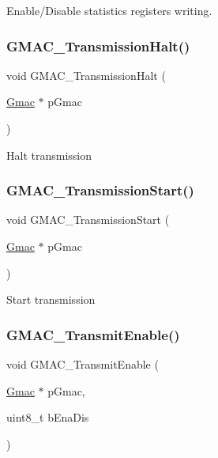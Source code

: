 Enable/\+Disable statistics registers writing. \mbox{\label{group__gmac__defines_gaec157405c56f5074b5f49268d3148c55}} 
\subsubsection{\texorpdfstring{GMAC\_TransmissionHalt()}{GMAC\_TransmissionHalt()}}
{\footnotesize\ttfamily void G\+M\+A\+C\+\_\+\+Transmission\+Halt (\begin{DoxyParamCaption}\item[{\mbox{\hyperlink{structGmac}{Gmac}} $\ast$}]{p\+Gmac }\end{DoxyParamCaption})}

Halt transmission \mbox{\label{group__gmac__defines_ga8f5a1bfd6e130370cda5f9f15b99d4aa}} 
\subsubsection{\texorpdfstring{GMAC\_TransmissionStart()}{GMAC\_TransmissionStart()}}
{\footnotesize\ttfamily void G\+M\+A\+C\+\_\+\+Transmission\+Start (\begin{DoxyParamCaption}\item[{\mbox{\hyperlink{structGmac}{Gmac}} $\ast$}]{p\+Gmac }\end{DoxyParamCaption})}

Start transmission \mbox{\label{group__gmac__defines_ga43e952eb0a8ec8d8131ac69b6a30842d}} 
\subsubsection{\texorpdfstring{GMAC\_TransmitEnable()}{GMAC\_TransmitEnable()}}
{\footnotesize\ttfamily void G\+M\+A\+C\+\_\+\+Transmit\+Enable (\begin{DoxyParamCaption}\item[{\mbox{\hyperlink{structGmac}{Gmac}} $\ast$}]{p\+Gmac,  }\item[{uint8\+\_\+t}]{b\+Ena\+Dis }\end{DoxyParamCaption})}


